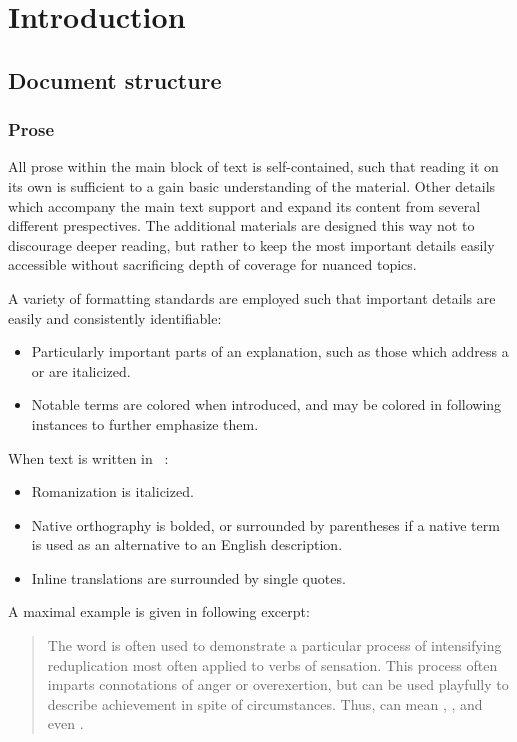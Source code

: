 \chapter{Introduction}
\section{Document structure}
\subsection{Prose}
All prose within the main block of text is self-contained, such that reading it on its own is sufficient to a gain basic understanding of the material.
Other details which accompany the main text support and expand its content from several different prespectives.
The additional materials are designed this way not to discourage deeper reading, but rather to keep the most important details easily accessible without sacrificing depth of coverage for nuanced topics.

A variety of formatting standards are employed such that important details are easily and consistently identifiable:

\begin{itemize}
  \item Particularly important parts of an explanation, such as those which address a  or  are italicized.
  \item Notable terms are colored  when introduced, and may be colored in following instances to further emphasize them.
\end{itemize}

When text is written in \langname\ :

\begin{itemize}
  \item Romanization is italicized.
  \item Native orthography is bolded, or surrounded by parentheses if a native term is used as an alternative to an English description.
  \item Inline translations are surrounded by single quotes.
\end{itemize}

A maximal example is given in following excerpt:

\begin{quote}
  The word   is often used to demonstrate a particular process of intensifying reduplication most often applied to verbs of sensation.
  This process  often imparts connotations of anger or overexertion, but can be used playfully to describe achievement in spite of circumstances.
  Thus, can mean , , and even .
\end{quote}

